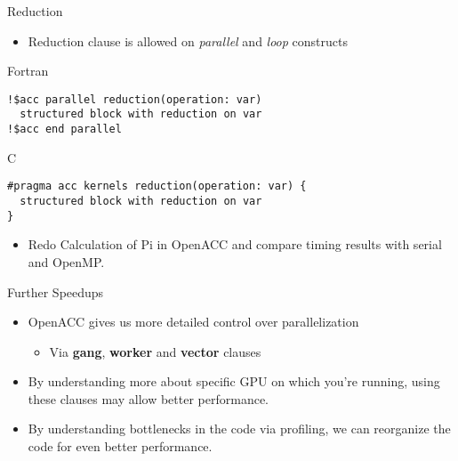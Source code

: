 \documentclass[c,mathserif,compress,xcolor=svgnames]{beamer}
\newenvironment{bblock}[0]
{
\begin{beamerboxesrounded}[upper=uppercol1,lower=lowercol1,shadow=true]}
{\end{beamerboxesrounded}}
\newenvironment{eblock}[0]
{
\begin{beamerboxesrounded}[upper=uppercol2,lower=lowercol2,shadow=true]}
{\end{beamerboxesrounded}}
\begin{document}
\begin{frame}[fragile]{\small Reduction}
  \begin{itemize}
    \item Reduction clause is allowed on \textit{parallel} and \textit{loop} constructs
  \end{itemize}
  \begin{eblock}{Fortran}
    \begin{lstlisting}[basicstyle=\tiny\ttfamily,language=OmpFortran]
!$acc parallel reduction(operation: var)
  structured block with reduction on var
!$acc end parallel
    \end{lstlisting}
  \end{eblock}
  \begin{eblock}{C}
    \begin{lstlisting}[basicstyle=\tiny\ttfamily,language=OmpC]
#pragma acc kernels reduction(operation: var) {
  structured block with reduction on var
}
    \end{lstlisting}
  \end{eblock}
  \begin{itemize}
    \item Redo Calculation of Pi in OpenACC and compare timing results with serial and OpenMP.
  \end{itemize}
\end{frame}

\begin{frame}{\small Further Speedups}
  \begin{bblock}{}
    \begin{itemize}
      \item OpenACC gives us more detailed control over parallelization
      \begin{itemize}
        \item Via \textbf{gang}, \textbf{worker} and \textbf{vector} clauses
      \end{itemize}
      \item By understanding more about specific GPU on which you're running, using these clauses may allow better performance.
      \item By understanding bottlenecks in the code via profiling, we can reorganize the code for even better performance.
    \end{itemize}
  \end{bblock}
\end{frame}
\end{document}
